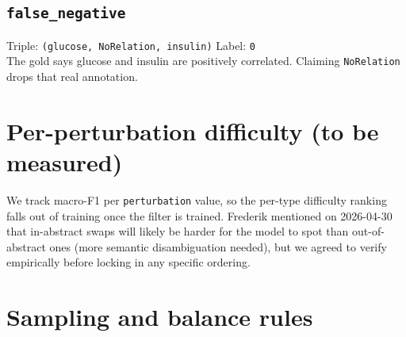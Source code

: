 \documentclass[11pt,a4paper]{article}
\newcommand{\code}[1]{\texttt{#1}}
\begin{document}
\subsection*{\code{false\_negative}}
Triple: \code{(glucose, NoRelation, insulin)} \hfill Label: \code{0}\\
The gold says glucose and insulin are positively correlated. Claiming \code{NoRelation} drops that real annotation.

\section*{Per-perturbation difficulty (to be measured)}

We track macro-F1 per \code{perturbation} value, so the per-type difficulty ranking falls out of training once the filter is trained. Frederik mentioned on 2026-04-30 that in-abstract swaps will likely be harder for the model to spot than out-of-abstract ones (more semantic disambiguation needed), but we agreed to verify empirically before locking in any specific ordering.

\section*{Sampling and balance rules}
\end{document}
